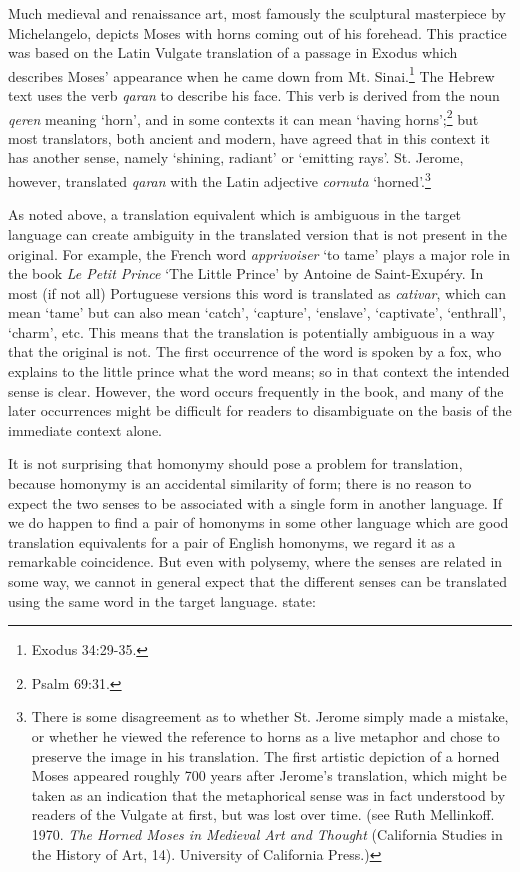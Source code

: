 Much medieval and renaissance art, most famously the sculptural masterpiece by Michelangelo, depicts Moses with horns coming out of his forehead. This practice was based on the Latin Vulgate translation of a passage in Exodus which describes Moses’ appearance when he came down from Mt. Sinai.\footnote{Exodus 34:29-35.} The Hebrew text uses the verb \textit{qaran} to describe his face. This verb is derived from the noun \textit{qeren} meaning ‘horn’, and in some contexts it can mean ‘having horns’;\footnote{Psalm 69:31.} but most translators, both ancient and modern, have agreed that in this context it has another sense, namely ‘shining, radiant’ or ‘emitting rays’. St. Jerome, however, translated \textit{qaran} with the Latin adjective \textit{cornuta} ‘horned’.\footnote{There is some disagreement as to whether St. Jerome simply made a mistake, or whether he viewed the reference to horns as a live metaphor and chose to preserve the image in his translation. The first artistic depiction of a horned Moses appeared roughly 700 years after Jerome’s translation, which might be taken as an indication that the metaphorical sense was in fact understood by readers of the Vulgate at first, but was lost over time. (see Ruth Mellinkoff. 1970. \textit{The Horned Moses in Medieval Art and Thought} (California Studies in the History of Art, 14). University of California Press.)}



As noted above, a translation equivalent which is ambiguous in the target language can create ambiguity in the translated version that is not present in the original. For example, the French word \textit{apprivoiser} ‘to tame’ plays a major role in the book \textit{Le Petit Prince} ‘The Little Prince’ by Antoine de Saint-Exupéry. In most (if not all) Portuguese versions this word is translated as \textit{cativar}, which can mean ‘tame’ but can also mean ‘catch’, ‘capture’, ‘enslave’, ‘captivate’, ‘enthrall’, ‘charm’, etc. This means that the translation is potentially ambiguous in a way that the original is not. The first occurrence of the word is spoken by a fox, who explains to the little prince what the word means; so in that context the intended sense is clear. However, the word occurs frequently in the book, and many of the later occurrences might be difficult for readers to disambiguate on the basis of the immediate context alone.



It is not surprising that homonymy should pose a problem for translation, because homonymy is an accidental similarity of form; there is no reason to expect the two senses to be associated with a single form in another language. If we do happen to find a pair of homonyms in some other language which are good translation equivalents for a pair of English homonyms, we regard it as a remarkable coincidence. But even with polysemy, where the senses are related in some way, we cannot in general expect that the different senses can be translated using the same word in the target language.   \citet[103]{BeekmanCallow1974} state:


